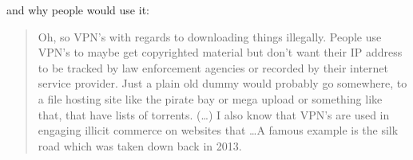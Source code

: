 and why people would use it: \begin{quote}Oh, so VPN's with regards to
downloading things illegally. People use VPN's to maybe get copyrighted
material but don't want their IP address to be tracked by law enforcement
agencies or recorded by their internet service provider. Just a plain old
dummy would probably go somewhere, to a file hosting site like the pirate bay
or mega upload or something like that, that have lists of torrents. (\dots) I
also know that VPN's are used in engaging illicit commerce on websites that
\dots A famous example is the silk road which was taken down back in 2013.
\end{quote}

